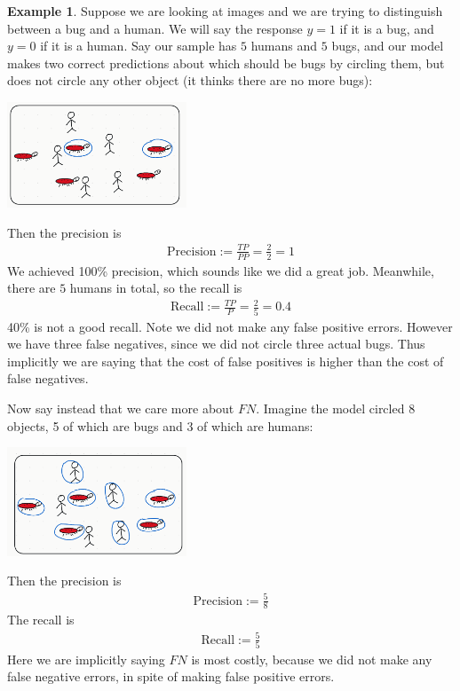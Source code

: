 \documentclass[12pt, a4paper]{article}
\theoremstyle{definition}
\newtheorem*{example}{Example}
\begin{document}
	\begin{tcolorbox}[breakable]
		\begin{example}
			Suppose we are looking at images and we are trying to distinguish
			between a bug and a human. We will say the response $y = 1$
			if it is a bug, and $y=0$ if it is a human. Say our sample
			has $5$ humans and $5$ bugs, and our model makes two correct predictions
			about which should be bugs by circling them, but does not circle
			any other object (it thinks there are no more bugs):
			\begin{center}
				\includegraphics[width=0.4\textwidth]{perfect-precision-2-bugs}
			\end{center}
			Then the precision is
			\begin{align*}
				\text{Precision} := \frac{TP}{PP} = \frac{2}{2} = 1
			\end{align*}
			We achieved 100\% precision, which sounds like we did a great job.
			Meanwhile, there are $5$ humans in total, so the recall is
			\begin{align*}
				\text{Recall} := \frac{TP}{P} = \frac{2}{5} = 0.4
			\end{align*}
			40\% is not a good recall. Note we did not make any false positive
			errors. However we have three false negatives, since we did not
			circle three actual bugs. Thus implicitly we are saying that
			the cost of false positives is higher than the cost of false negatives.
			
			Now say instead that we care more about $FN$. Imagine the model
			circled 8 objects, 5 of which are bugs and 3 of which are humans:
			\begin{center}
				\includegraphics[width=0.4\textwidth]{perfect-recall-5-bugs-3-humans}
			\end{center}
			Then the precision is
			\begin{align*}
				\text{Precision} := \frac{5}{8}
			\end{align*}
			The recall is
			\begin{align*}
				\text{Recall} := \frac{5}{5}
			\end{align*}
			Here we are implicitly saying $FN$ is most costly, because we did
			not make any false negative errors, in spite of making false positive
			errors.
		\end{example}
	\end{tcolorbox}
\end{document}
